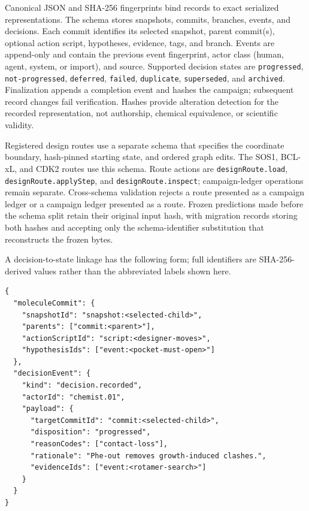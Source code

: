 \documentclass[11pt]{article}
\begin{document}
\begin{small}
Canonical JSON and SHA-256 fingerprints bind records to exact serialized representations. The  schema stores snapshots, commits, branches, events, and decisions. Each commit identifies its selected snapshot, parent commit(s), optional action script, hypotheses, evidence, tags, and branch. Events are append-only and contain the previous event fingerprint, actor class (human, agent, system, or import), and source. Supported decision states are \texttt{progressed}, \texttt{not-progressed}, \texttt{deferred}, \texttt{failed}, \texttt{duplicate}, \texttt{superseded}, and \texttt{archived}. Finalization appends a completion event and hashes the campaign; subsequent record changes fail verification. Hashes provide alteration detection for the recorded representation, not authorship, chemical equivalence, or scientific validity.

Registered design routes use a separate  schema that specifies the coordinate boundary, hash-pinned starting state, and ordered graph edits. The SOS1, BCL-xL, and CDK2 routes use this schema. Route actions are \texttt{designRoute.load}, \texttt{designRoute.applyStep}, and \texttt{designRoute.inspect}; campaign-ledger operations remain separate. Cross-schema validation rejects a route presented as a campaign ledger or a campaign ledger presented as a route. Frozen predictions made before the schema split retain their original input hash, with migration records storing both hashes and accepting only the schema-identifier substitution that reconstructs the frozen bytes.

A decision-to-state linkage has the following form; full identifiers are SHA-256-derived values rather than the abbreviated labels shown here.

\begin{lstlisting}
{
  "moleculeCommit": {
    "snapshotId": "snapshot:<selected-child>",
    "parents": ["commit:<parent>"],
    "actionScriptId": "script:<designer-moves>",
    "hypothesisIds": ["event:<pocket-must-open>"]
  },
  "decisionEvent": {
    "kind": "decision.recorded",
    "actorId": "chemist.01",
    "payload": {
      "targetCommitId": "commit:<selected-child>",
      "disposition": "progressed",
      "reasonCodes": ["contact-loss"],
      "rationale": "Phe-out removes growth-induced clashes.",
      "evidenceIds": ["event:<rotamer-search>"]
    }
  }
}
\end{lstlisting}


\end{small}
\end{document}
